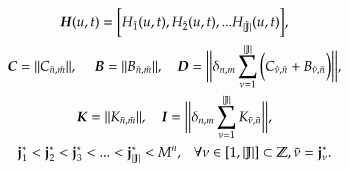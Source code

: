 \begin{gather*}
	\boldsymbol{H}(u,t) = \bigg[H_{\tilde{1}}(u,t), H_{\tilde{2}}(u,t), ... H_{\tilde{|\mathbb{J}|} }(u,t)\bigg] ,\\
	\boldsymbol{C} = ||C_{\tilde{n},\tilde{m}}||,
	\text{ }\text{ }\text{ }\text{ }\text{ }
	\boldsymbol{B} = ||B_{\tilde{n},\tilde{m}}||,
	\text{ }\text{ }\text{ }\text{ }\boldsymbol{D} = \bigg|\bigg|\delta_{n,m}
	\sum_{\nu = 1}^{|\mathbb{J}|}\bigg(C_{\tilde{\nu},\tilde{n}} + B_{\tilde{\nu},\tilde{n}} \bigg)\bigg|\bigg|, \\
	\boldsymbol{K} = ||K_{\tilde{n},\tilde{m}}||,
	\text{ }\text{ }\text{ }\text{ }\boldsymbol{I} = \bigg|\bigg|\delta_{n,m}
	\sum_{\nu = 1}^{|\mathbb{J}|}K_{\tilde{\nu},\tilde{n}}\bigg|\bigg|, \\
	\bold{j}^*_1 < \bold{j}^*_2 < \bold{j}^*_3 <... < \bold{j}^*_{|\mathbb{J}|} < M^n, \text{ }\text{ }\text{ }
	\forall \nu \in [1, |\mathbb{J}|] \subset \mathbb{Z}, \tilde{\nu} = \bold{j}^*_{\nu}.
\end{gather*}

